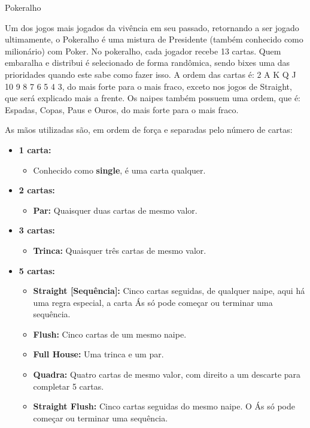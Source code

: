 \begin{subsecao}{Pokeralho}

Um dos jogos mais jogados da vivência em seu passado, retornando a ser jogado ultimamente, o
Pokeralho é uma mistura de Presidente (também conhecido como milionário) com
Poker. No pokeralho, cada jogador recebe 13 cartas. Quem embaralha e distribui é
selecionado de forma randômica, sendo bixes uma das prioridades quando este sabe
como fazer isso. A ordem das cartas é: 2 A K Q J 10 9 8 7 6 5 4 3, do mais forte
para o mais fraco, exceto nos jogos de Straight, que será explicado mais a
frente. Os naipes também possuem uma ordem, que é: Espadas, Copas, Paus e Ouros,
do mais forte para o mais fraco.

As mãos utilizadas são, em ordem de força e separadas pelo número de cartas:

\begin{itemize}

\item \textbf {1 carta:}
\begin{itemize}
\item Conhecido como \textbf{single}, é uma carta qualquer.
\end{itemize}
\item \textbf {2 cartas:}
\begin{itemize}

\item \textbf{Par:} Quaisquer duas cartas de mesmo valor.
\end{itemize}
\item \textbf {3 cartas:}

\begin{itemize}
\item \textbf{Trinca:} Quaisquer três cartas de mesmo valor.
\end{itemize}
\item \textbf {5 cartas:}

\begin{itemize}
\item \textbf{Straight [Sequência]:} Cinco cartas seguidas, de qualquer naipe,
aqui há uma regra especial, a carta Ás só pode começar ou terminar uma
sequência.
\item \textbf{Flush:} Cinco cartas de um mesmo naipe.
\item \textbf{Full House:} Uma trinca e um par.
\item \textbf{Quadra:} Quatro cartas de mesmo valor, com direito a um descarte
para completar 5 cartas.
\item \textbf{Straight Flush:} Cinco cartas seguidas do mesmo naipe. O Ás só
pode começar ou terminar uma sequência. 
\end{itemize}


\end{itemize}
\end{subsecao}
